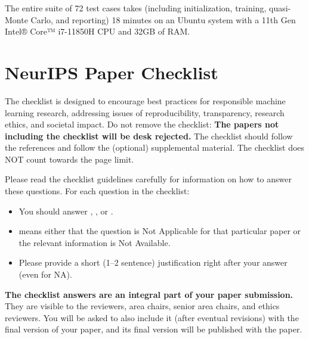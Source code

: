 \documentclass{article}
\begin{document}
The entire suite of 72 test cases takes (including initialization, training, quasi-Monte Carlo, and reporting)
 18 minutes
 on an Ubuntu system with a 11th Gen Intel® Core™ i7-11850H CPU and 32GB of RAM.

\clearpage



\newpage
\section*{NeurIPS Paper Checklist}

The checklist is designed to encourage best practices for responsible machine learning research, addressing issues of reproducibility, transparency, research ethics, and societal impact. Do not remove the checklist: {\bf The papers not including the checklist will be desk rejected.} The checklist should follow the references and follow the (optional) supplemental material.  The checklist does NOT count towards the page
limit. 

Please read the checklist guidelines carefully for information on how to answer these questions. For each question in the checklist:
\begin{itemize}
    \item You should answer \answerYes{}, \answerNo{}, or \answerNA{}.
    \item \answerNA{} means either that the question is Not Applicable for that particular paper or the relevant information is Not Available.
    \item Please provide a short (1–2 sentence) justification right after your answer (even for NA). 
\end{itemize}

{\bf The checklist answers are an integral part of your paper submission.} They are visible to the reviewers, area chairs, senior area chairs, and ethics reviewers. You will be asked to also include it (after eventual revisions) with the final version of your paper, and its final version will be published with the paper.
\end{document}
